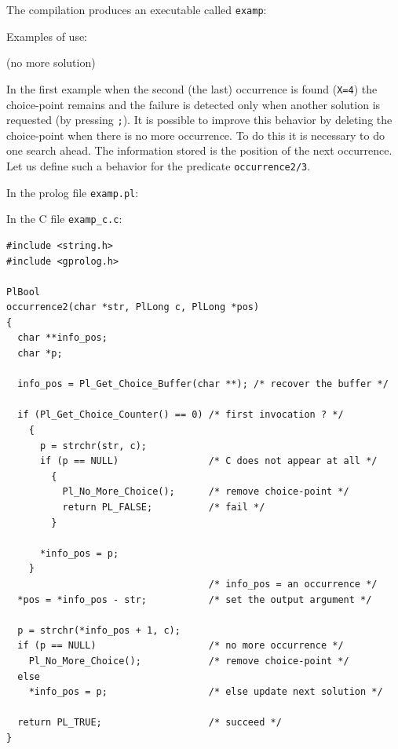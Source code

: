 The compilation produces an executable called \texttt{examp}:


Examples of use:

\begin{CodeTwoCols}
\SkipLine
{}
\SkipLine
{}
\SkipLine
{}     {(no more solution)}
\SkipLine
{}
\SkipLine
{}
\end{CodeTwoCols}

In the first example when the second (the last) occurrence is found
(\texttt{X=4}) the choice-point remains and the failure is detected only when
another solution is requested (by pressing \texttt{;}). It is possible to
improve this behavior by deleting the choice-point when there is no more
occurrence. To do this it is necessary to do one search ahead. The
information stored is the position of the next occurrence. Let us define such
a behavior for the predicate \texttt{occurrence2/3}.

In the prolog file \texttt{examp.pl}:


In the C file \texttt{examp\_c.c}:

\begin{Code}
\begin{verbatim}
#include <string.h>
#include <gprolog.h>

PlBool
occurrence2(char *str, PlLong c, PlLong *pos)
{
  char **info_pos;
  char *p;

  info_pos = Pl_Get_Choice_Buffer(char **); /* recover the buffer */

  if (Pl_Get_Choice_Counter() == 0) /* first invocation ? */
    {
      p = strchr(str, c);
      if (p == NULL)                /* C does not appear at all */
        {
          Pl_No_More_Choice();      /* remove choice-point */
          return PL_FALSE;          /* fail */
        }

      *info_pos = p;
    }
                                    /* info_pos = an occurrence */
  *pos = *info_pos - str;           /* set the output argument */

  p = strchr(*info_pos + 1, c);
  if (p == NULL)                    /* no more occurrence */
    Pl_No_More_Choice();            /* remove choice-point */
  else
    *info_pos = p;                  /* else update next solution */

  return PL_TRUE;                   /* succeed */
}
\end{verbatim}
\end{Code}

